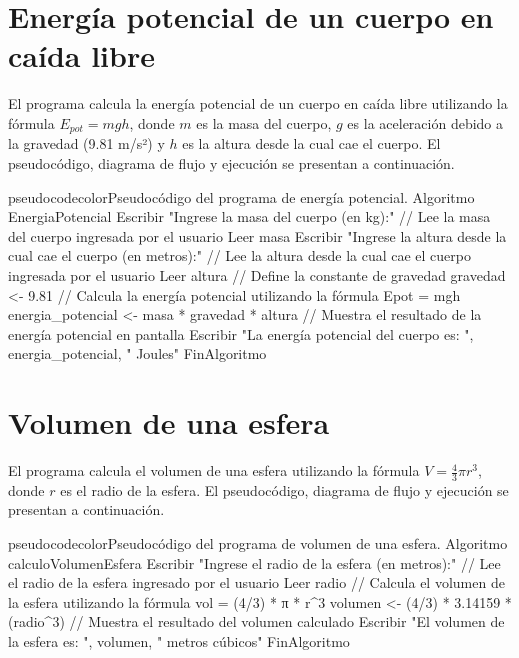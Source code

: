 \documentclass[
	spanish, %
	letterpaper, oneside
]{article}
\begin{document}
\section{Energía potencial de un cuerpo en caída libre}

El programa calcula la energía potencial de un cuerpo en caída libre utilizando la fórmula $E_{pot} = mgh$, donde $m$ es la masa del cuerpo, $g$ es la aceleración debido a la gravedad (9.81 m/s²) y $h$ es la altura desde la cual cae el cuerpo. El pseudocódigo, diagrama de flujo y ejecución se presentan a continuación.

\begin{sourcecode}{pseudocodecolor}{Pseudocódigo del programa de energía potencial.}
Algoritmo EnergiaPotencial
	Escribir "Ingrese la masa del cuerpo (en kg):"
	// Lee la masa del cuerpo ingresada por el usuario
	Leer masa
	Escribir "Ingrese la altura desde la cual cae el cuerpo (en metros):"
	// Lee la altura desde la cual cae el cuerpo ingresada por el usuario
	Leer altura
	// Define la constante de gravedad
	gravedad <- 9.81
	// Calcula la energía potencial utilizando la fórmula Epot = mgh
	energia_potencial <- masa * gravedad * altura
	// Muestra el resultado de la energía potencial en pantalla
	Escribir "La energía potencial del cuerpo es: ", energia_potencial, " Joules"
FinAlgoritmo
\end{sourcecode}



\section{Volumen de una esfera}

El programa calcula el volumen de una esfera utilizando la fórmula $V = \frac{4}{3}\pi r^3$, donde $r$ es el radio de la esfera. El pseudocódigo, diagrama de flujo y ejecución se presentan a continuación.

\begin{sourcecode}{pseudocodecolor}{Pseudocódigo del programa de volumen de una esfera.}
Algoritmo calculoVolumenEsfera
    Escribir "Ingrese el radio de la esfera (en metros):"
    // Lee el radio de la esfera ingresado por el usuario
    Leer radio
    // Calcula el volumen de la esfera utilizando la fórmula vol = (4/3) * π * r^3
    volumen <- (4/3) * 3.14159 * (radio^3)
    // Muestra el resultado del volumen calculado
    Escribir "El volumen de la esfera es: ", volumen, " metros cúbicos"
FinAlgoritmo
\end{sourcecode}
\end{document}
